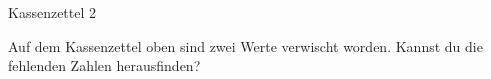 \documentclass[12pt,a5paper,landscape]{scrartcl}
\begin{document}
	\begin{karte2}{Kassenzettel 2}
		\begin{center}
		\end{center}
		
		Auf dem Kassenzettel oben sind zwei Werte verwischt worden. Kannst du die fehlenden Zahlen herausfinden?
		
	\end{karte2}
	
	\leereKarte
\end{document}
